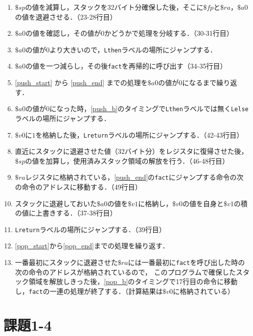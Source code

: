 \documentclass[a4j,11pt]{jarticle}
\begin{document}
\begin{enumerate}
      \item \label{push_start} $\$sp$の値を減算し，スタックを32バイト分確保した後，そこに$\$fp$と$\$ra$，$\$a0$の値を退避させる．（23-28行目）
      \item $\$a0$の値を確認し，その値が$0$かどうかで処理を分岐する．（30-31行目）
      \item \label{push_b}$\$a0$の値が$0$より大きいので，{\tt Lthen}ラベルの場所にジャンプする．
      \item \label{push_end}$\$a0$の値を一つ減らし，その後{\tt fact}を再帰的に呼び出す（34-35行目）
      \item \ref{push_start} から \ref{push_end} までの処理を$\$a0$の値が$0$になるまで繰り返す．
      \item $\$a0$の値が$0$になった時，\ref{push_b}のタイミングで{\tt Lthen}ラベルでは無く{\tt Lelse}ラベルの場所にジャンプする．
      \item $\$v0$に$1$を格納した後，{\tt Lreturn}ラベルの場所にジャンプする．（42-43行目）
      \item \label{pop_start}直近にスタックに退避させた値（32バイト分）をレジスタに復帰させた後，$\$sp$の値を加算し，使用済みスタック領域の解放を行う．（46-48行目）
      \item \label{pop_b}$\$ra$レジスタに格納されている，\ref{push_end}の{\tt fact}にジャンプする命令の次の命令のアドレスに移動する．（49行目）
      \item スタックに退避しておいた$\$a0$の値を$\$v1$に格納し，$\$v0$の値を自身と$\$v1$の積の値に上書きする．（37-38行目）
      \item \label{pop_end}{\tt Lreturn}ラベルの場所にジャンプする．（39行目）
      \item \ref{pop_start}から\ref{pop_end}までの処理を繰り返す．
      \item 一番最初にスタックに退避させた$\$ra$には一番最初に{\tt fact}を呼び出した時の次の命令のアドレスが格納されているので，
      このプログラムで確保したスタック領域を解放しきった後，\ref{pop_b}のタイミングで17行目の命令に移動し，{\tt fact}の一連の処理が終了する．（計算結果は$\$v0$に格納されている）
\end{enumerate}

\section{課題1-4}
\end{document}
